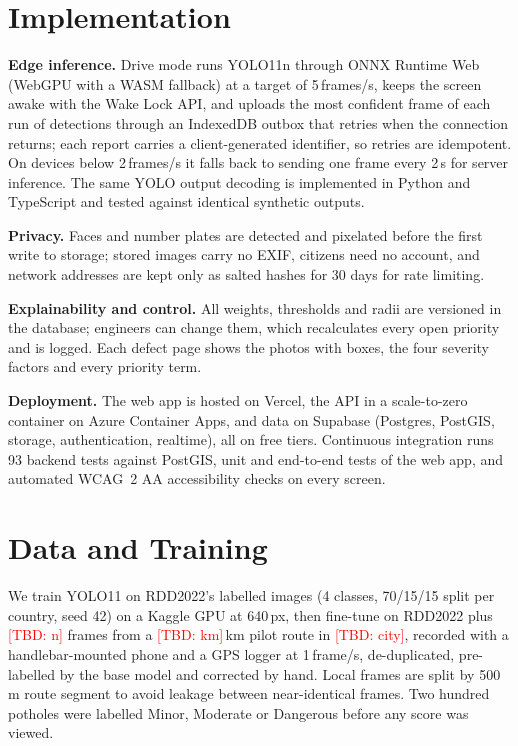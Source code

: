 \documentclass[conference]{IEEEtran}
\newcommand{\res}[1]{\textcolor{red}{[TBD: #1]}}
\begin{document}
\section{Implementation}
\textbf{Edge inference.} Drive mode runs YOLO11n through ONNX Runtime Web (WebGPU with a WASM
fallback) at a target of 5\,frames/s, keeps the screen awake with the Wake Lock API, and uploads
the most confident frame of each run of detections through an IndexedDB outbox that retries when
the connection returns; each report carries a client-generated identifier, so retries are
idempotent. On devices below 2\,frames/s it falls back to sending one frame every 2\,s for server
inference. The same YOLO output decoding is implemented in Python and TypeScript and tested
against identical synthetic outputs.

\textbf{Privacy.} Faces and number plates are detected and pixelated before the first write to
storage; stored images carry no EXIF, citizens need no account, and network addresses are kept only
as salted hashes for 30 days for rate limiting.

\textbf{Explainability and control.} All weights, thresholds and radii are versioned in the
database; engineers can change them, which recalculates every open priority and is logged.
Each defect page shows the photos with boxes, the four severity factors and every priority term.

\textbf{Deployment.} The web app is hosted on Vercel, the API in a scale-to-zero container on Azure
Container Apps, and data on Supabase (Postgres, PostGIS, storage, authentication, realtime), all on
free tiers. Continuous integration runs 93 backend tests against PostGIS, unit and end-to-end tests
of the web app, and automated WCAG~2 AA accessibility checks on every screen.

\section{Data and Training}
We train YOLO11 on RDD2022's labelled images (4 classes, 70/15/15 split per country, seed 42) on a
Kaggle GPU at 640\,px, then fine-tune on RDD2022 plus \res{n} frames from a \res{km}\,km pilot route
in \res{city}, recorded with a handlebar-mounted phone and a GPS logger at 1\,frame/s, de-duplicated,
pre-labelled by the base model and corrected by hand. Local frames are split by 500\,m route segment
to avoid leakage between near-identical frames. Two hundred potholes were labelled Minor, Moderate or
Dangerous before any score was viewed.
\end{document}
